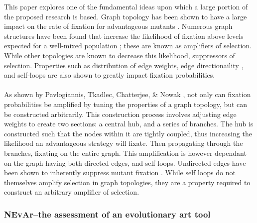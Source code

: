 \documentclass[10pt,a4paper]{article}
\begin{document}
This paper explores one of the fundamental ideas upon which a large portion of the proposed research is based.
Graph topology has been shown to have a large impact on the rate of fixation for advantageous mutants \cite{graph-amplifiers, birth-death-amplifiers, cooperation-on-graphs}.
Numerous graph structures have been found that increase the likelihood of fixation above levels expected for a well-mixed population \cite{lieberman2005evolutionary, birth-death-amplifiers}; these are known as amplifiers of selection.
While other topologies are known to decrease this likelihood, suppressors of selection.
Properties such as distribution of edge weights, edge directionaility \cite{birth-death-amplifiers}, and self-loops are also shown to greatly impact fixation probabilities.
\\\\
As shown by Pavlogiannis, Tkadlec, Chatterjee, \& Nowak \cite{graph-amplifiers}, not only can fixation probabilities be amplified by tuning the properties of a graph topology, but can be constructed arbitrarily.
This construction process involves adjusting edge weights to create two sections: a central hub, and a series of branches.
The hub is constructed such that the nodes within it are tightly coupled, thus increasing the likelihood an advantageous strategy will fixate.
Then propagating through the branches, fixating on the entire graph.
This amplification is however dependant on the graph having both directed edges, and self loops.
Undirected edges have been shown to inherently suppress mutant fixation \cite{birth-death-amplifiers}.
While self loops do not themselves amplify selection in graph topologies, they are a property required to construct an arbitrary amplifier of selection.


\subsubsection{NEvAr–the assessment of an evolutionary art tool \cite{nevar}}
\end{document}
